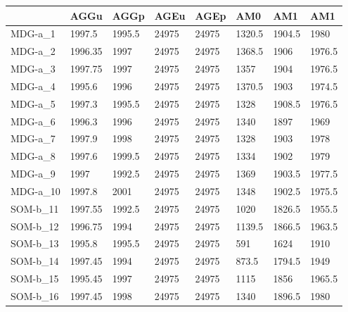 \documentclass[11pt,a4paper]{article}
\begin{document}
	\begin{table}[H]
		\begin{tabular}{l|l|l|l|l|l|l|l|}
			\cline{2-8}
			& AGGu    & AGGp   & AGEu  & AGEp  & AM0    & AM1    & AM1    \\ \hline
			\multicolumn{1}{|l|}{MDG-a\_1}  & 1997.5  & 1995.5 & 24975 & 24975 & 1320.5 & 1904.5 & 1980   \\ \hline
			\multicolumn{1}{|l|}{MDG-a\_2}  & 1996.35 & 1997   & 24975 & 24975 & 1368.5 & 1906   & 1976.5 \\ \hline
			\multicolumn{1}{|l|}{MDG-a\_3}  & 1997.75 & 1997   & 24975 & 24975 & 1357   & 1904   & 1976.5 \\ \hline
			\multicolumn{1}{|l|}{MDG-a\_4}  & 1995.6  & 1996   & 24975 & 24975 & 1370.5 & 1903   & 1974.5 \\ \hline
			\multicolumn{1}{|l|}{MDG-a\_5}  & 1997.3  & 1995.5 & 24975 & 24975 & 1328   & 1908.5 & 1976.5 \\ \hline
			\multicolumn{1}{|l|}{MDG-a\_6}  & 1996.3  & 1996   & 24975 & 24975 & 1340   & 1897   & 1969   \\ \hline
			\multicolumn{1}{|l|}{MDG-a\_7}  & 1997.9  & 1998   & 24975 & 24975 & 1328   & 1903   & 1978   \\ \hline
			\multicolumn{1}{|l|}{MDG-a\_8}  & 1997.6  & 1999.5 & 24975 & 24975 & 1334   & 1902   & 1979   \\ \hline
			\multicolumn{1}{|l|}{MDG-a\_9}  & 1997    & 1992.5 & 24975 & 24975 & 1369   & 1903.5 & 1977.5 \\ \hline
			\multicolumn{1}{|l|}{MDG-a\_10} & 1997.8  & 2001   & 24975 & 24975 & 1348   & 1902.5 & 1975.5 \\ \hline
			\multicolumn{1}{|l|}{SOM-b\_11} & 1997.55 & 1992.5 & 24975 & 24975 & 1020   & 1826.5 & 1955.5 \\ \hline
			\multicolumn{1}{|l|}{SOM-b\_12} & 1996.75 & 1994   & 24975 & 24975 & 1139.5 & 1866.5 & 1963.5 \\ \hline
			\multicolumn{1}{|l|}{SOM-b\_13} & 1995.8  & 1995.5 & 24975 & 24975 & 591    & 1624   & 1910   \\ \hline
			\multicolumn{1}{|l|}{SOM-b\_14} & 1997.45 & 1994   & 24975 & 24975 & 873.5  & 1794.5 & 1949   \\ \hline
			\multicolumn{1}{|l|}{SOM-b\_15} & 1995.45 & 1997   & 24975 & 24975 & 1115   & 1856   & 1965.5 \\ \hline
			\multicolumn{1}{|l|}{SOM-b\_16} & 1997.45 & 1998   & 24975 & 24975 & 1340   & 1896.5 & 1980   \\ \hline

\end{tabular}
\end{table}
\end{document}
